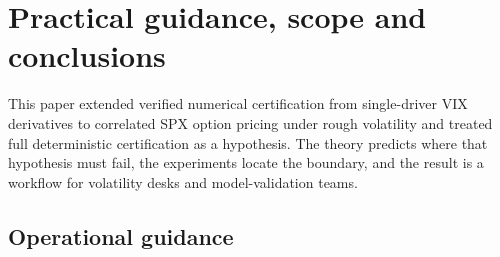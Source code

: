 \section{Practical guidance, scope and conclusions}
\label{sec:conclusions}

This paper extended verified numerical certification from single-driver VIX derivatives \citep{AhmedEtAl2026RoughCert} to correlated SPX option pricing under rough volatility and treated full deterministic certification as a hypothesis. The theory predicts where that hypothesis must fail, the experiments locate the boundary, and the result is a workflow for volatility desks and model-validation teams.

\subsection{Operational guidance}

